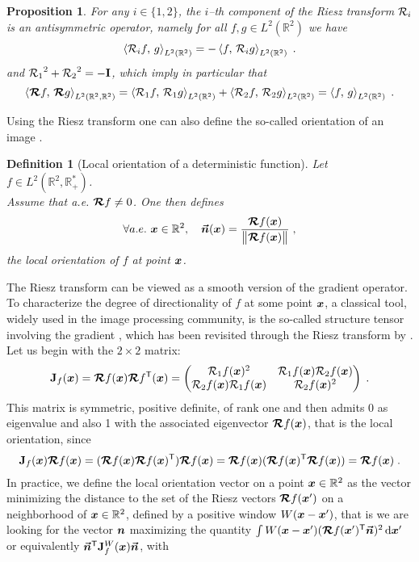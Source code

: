 \documentclass{elsarticle}
\newtheorem{proposition}{Proposition}
\newtheorem{definition}{Definition}
\def\vx{\vect{x}}
\begin{document}
\begin{proposition}\label{pro:unit}
For any $i\in\{1,2\}$, the $i$--th component of the Riesz transform $\mathcal{R}_i$ is an antisymmetric operator, namely for all $f,g\in L^2(\mathbb{R}^2)$ we have
\[
\left \langle \mathcal{R}_i f,\, g\right \rangle_{L^2(\mathbb{R}^2)}=-\left \langle f,\, \mathcal{R}_i g\right \rangle_{L^2(\mathbb{R}^2)}\;.
\]
and ${\mathcal{R}_1}^2+{\mathcal{R}_2}^2=-\mathbf{I}$, which imply in particular that
\[
\left \langle \bm{\mathcal{R}} f,\, \bm{\mathcal{R}} g\right \rangle_{L^2(\mathbb{R}^2,\mathbb{R}^2)}=\left \langle \mathcal{R}_1 f,\, \mathcal{R}_1 g\right \rangle_{L^2(\mathbb{R}^2)}+\left \langle \mathcal{R}_2 f,\, \mathcal{R}_2 g\right \rangle_{L^2(\mathbb{R}^2)}=
\left \langle f,\, g\right \rangle_{L^2(\mathbb{R}^2)}\;.
\]
\end{proposition}
Using the Riesz transform one can also define the so-called orientation of an image \cite{FS01,YQS11}.
\begin{definition}[Local orientation of a deterministic function]
Let $f\in L^2(\mathbb{R}^2, \mathbb{R}^*_+)$. \\ Assume that a.e. $\bm{\mathcal{R}} f\neq 0$. One then defines 
\[
\forall a.e. ~\vect{x}\in\mathbb{R}^2,\quad \vect{\vec n}(\vx)=\frac{\RTb f(\vx)}{\norme{\RTb f(\vx)}}\;,
\]
the local orientation of $f$ at point $\bm{x}$.
\end{definition}
%
The Riesz transform can be viewed as a smooth version of the gradient operator. To characterize the degree of directionality of $f$ at some point $\bm{x}$, a classical tool, widely used in the image processing community, is the so-called structure tensor involving the gradient \cite{bigun1987optimal,harris1988combined,jahne2004practical}, which has been revisited through the Riesz transform by \cite{F02}. Let us begin with the $2\times 2$ matrix:
\begin{equation}\label{eq:Jf}
\mathbf{J}_f(\bm{x})=\bm{\mathcal{R}} f(\bm{x})\bm{\mathcal{R}} f^{\mathsf{T}}(\bm{x})=\begin{pmatrix}\mathcal{R}_1 f(\bm{x})^2&\mathcal{R}_1 f(\bm{x})\mathcal{R}_2 f(\bm{x})\\ \mathcal{R}_2 f(\bm{x})\mathcal{R}_1 f(\bm{x})&\mathcal{R}_2 f(\bm{x})^2\end{pmatrix}\;.
\end{equation}
This matrix is symmetric, positive definite, of rank one and then admits 0 as eigenvalue and also 1 with the associated eigenvector $\bm{\mathcal{R}} f(\bm{x})$, that is the local orientation, since 
\[
\mathbf{J}_f(\bm{x})\bm{\mathcal{R}} f(\bm{x})=(\bm{\mathcal{R}} f(\bm{x})\bm{\mathcal{R}} f(\bm{x})^{\mathsf{T}})\bm{\mathcal{R}} f(\bm{x})=\bm{\mathcal{R}} f(\bm{x})(\bm{\mathcal{R}} f(\bm{x})^{\mathsf{T}}\bm{\mathcal{R}} f(\bm{x}))=\bm{\mathcal{R}} f(\bm{x})\;.
\] 
In practice, we define the local orientation vector on a point $\bm{x}\in \mathbb{R}^2$ as the vector minimizing the distance to the set of the Riesz vectors $\bm{\mathcal{R}} f (\bm{x}')$ on a neighborhood of $\bm{x}\in \mathbb{R}^2$, defined by a positive window $W(\bm{x}-\bm{x}')$, that is we are looking for the vector $\bm{n}$ maximizing the quantity $ \int W(\bm{x}-\bm{x}')(\bm{\mathcal{R}} f(\bm{x}')^{\mathsf{T}}\bm{\vec n})^2\mathop{}\mathopen{}\mathrm{d} \bm{x}'$ or equivalently $\bm{\vec n}^{\mathsf{T}}\mathbf{J}_f^W(\bm{x})\bm{\vec n}$, with
\end{document}
